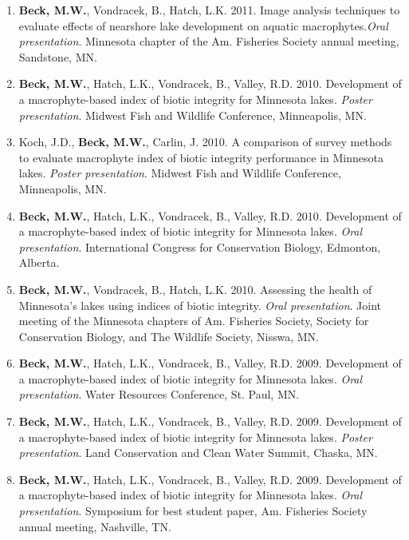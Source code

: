 \documentclass[letterpaper,12pt]{article}
\begin{document}
\begin{enumerate}
\item {\bf Beck, M.W.}, Vondracek, B., Hatch, L.K. 2011. Image analysis techniques to evaluate effects of nearshore lake development on aquatic macrophytes.\textit{Oral presentation}. Minnesota chapter of the Am. Fisheries Society annual meeting, Sandstone, MN.

\item {\bf Beck, M.W.}, Hatch, L.K., Vondracek, B., Valley, R.D. 2010. Development of a macrophyte-based index of biotic integrity for Minnesota lakes. \textit{Poster presentation}. Midwest Fish and Wildlife Conference, Minneapolis, MN.

\item Koch, J.D., {\bf Beck, M.W.}, Carlin, J. 2010. A comparison of survey methods to evaluate macrophyte index of biotic integrity performance in Minnesota lakes. \textit{Poster presentation}. Midwest Fish and Wildlife Conference, Minneapolis, MN.

\item {\bf Beck, M.W.}, Hatch, L.K., Vondracek, B., Valley, R.D. 2010. Development of a macrophyte-based index of biotic integrity for Minnesota lakes. \textit{Oral presentation}. International Congress for Conservation Biology, Edmonton, Alberta.

\item {\bf Beck, M.W.}, Vondracek, B., Hatch, L.K. 2010. Assessing the health of Minnesota's lakes using indices of biotic integrity. \textit{Oral presentation}. Joint meeting of the Minnesota chapters of Am. Fisheries Society, Society for Conservation Biology, and The Wildlife Society, Nisswa, MN.

\item {\bf Beck, M.W.}, Hatch, L.K., Vondracek, B., Valley, R.D. 2009. Development of a macrophyte-based index of biotic integrity for Minnesota lakes. \textit{Oral presentation}. Water Resources Conference, St. Paul, MN.

\item {\bf Beck, M.W.}, Hatch, L.K., Vondracek, B., Valley, R.D. 2009. Development of a macrophyte-based index of biotic integrity for Minnesota lakes. \textit{Poster presentation}. Land Conservation and Clean Water Summit, Chaska, MN.

\item {\bf Beck, M.W.}, Hatch, L.K., Vondracek, B., Valley, R.D. 2009. Development of a macrophyte-based index of biotic integrity for Minnesota lakes. \textit{Oral presentation}. Symposium for best student paper, Am. Fisheries Society annual meeting, Nashville, TN.


\end{enumerate}
\end{document}
